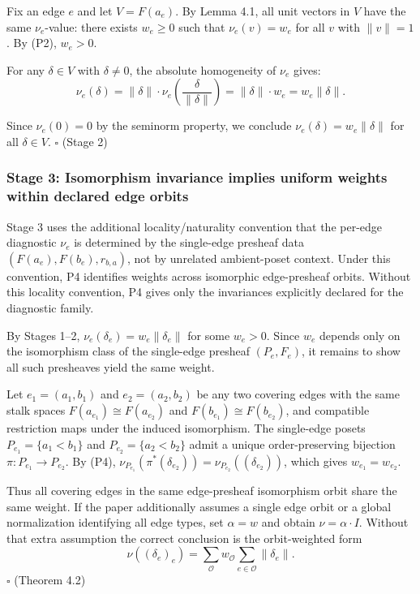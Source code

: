 \documentclass[
  11pt,
]{article}
\begin{document}
Fix an edge \(e\) and let \(V = F(a_e)\). By Lemma 4.1, all unit vectors in \(V\) have the same \(\nu_e\)-value: there exists \(w_e \geq 0\) such that \(\nu_e(v) = w_e\) for all \(v\) with \(\|v\| = 1\). By (P2), \(w_e > 0\).

For any \(\delta \in V\) with \(\delta \neq 0\), the absolute homogeneity of \(\nu_e\) gives:
\[\nu_e(\delta) = \|\delta\| \cdot \nu_e\!\left(\frac{\delta}{\|\delta\|}\right) = \|\delta\| \cdot w_e = w_e \|\delta\|.\]

Since \(\nu_e(0) = 0\) by the seminorm property, we conclude \(\nu_e(\delta) = w_e \|\delta\|\) for all \(\delta \in V\). \(\square\) (Stage 2)

\subsubsection{Stage 3: Isomorphism invariance implies uniform weights within declared edge orbits}\label{stage-3-isomorphism-invariance-implies-uniform-weights-within-declared-edge-orbits}

Stage 3 uses the additional locality/naturality convention that the per-edge diagnostic \(\nu_e\) is determined by the single-edge presheaf data \((F(a_e),F(b_e),r_{b,a})\), not by unrelated ambient-poset context. Under this convention, P4 identifies weights across isomorphic edge-presheaf orbits. Without this locality convention, P4 gives only the invariances explicitly declared for the diagnostic family.

By Stages 1--2, \(\nu_e(\delta_e) = w_e \|\delta_e\|\) for some \(w_e > 0\). Since \(w_e\) depends only on the isomorphism class of the single-edge presheaf \((P_e, F_e)\), it remains to show all such presheaves yield the same weight.

Let \(e_1 = (a_1, b_1)\) and \(e_2 = (a_2, b_2)\) be any two covering edges with the same stalk spaces \(F(a_{e_1}) \cong F(a_{e_2})\) and \(F(b_{e_1}) \cong F(b_{e_2})\), and compatible restriction maps under the induced isomorphism. The single-edge posets \(P_{e_1} = \{a_1 < b_1\}\) and \(P_{e_2} = \{a_2 < b_2\}\) admit a unique order-preserving bijection \(\pi: P_{e_1} \to P_{e_2}\). By (P4), \(\nu_{P_{e_1}}(\pi^*(\delta_{e_2})) = \nu_{P_{e_2}}((\delta_{e_2}))\), which gives \(w_{e_1} = w_{e_2}\).

Thus all covering edges in the same edge-presheaf isomorphism orbit share the same weight. If the paper additionally assumes a single edge orbit or a global normalization identifying all edge types, set \(\alpha=w\) and obtain \(\nu=\alpha\cdot I\). Without that extra assumption the correct conclusion is the orbit-weighted form
\[
\nu((\delta_e)_e)=\sum_{\mathcal O} w_{\mathcal O}\sum_{e\in\mathcal O}\|\delta_e\|.
\]
\(\square\) (Theorem 4.2)
\end{document}
